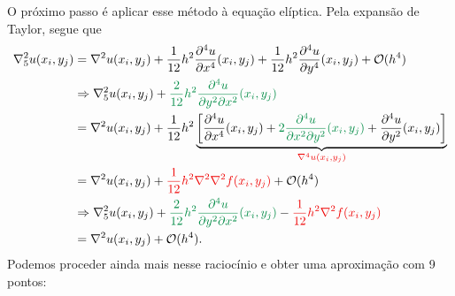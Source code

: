 \documentclass[../differential_methods.tex]{subfiles}
\begin{document}
O próximo passo é aplicar esse método à equação elíptica. Pela expansão de Taylor, segue que
\begin{align*}
	\nabla_{5}^{2}u(x_{i}, y_{j}) & =\nabla^{2}u(x_{i}, y_{j})+\frac{1}{12}h^{2}\frac{\partial^{4}u}{\partial x^{4}}(x_{i}, y_{j})+\frac{1}{12}h^{2}\frac{\partial^{4}u}{\partial y^{4}}(x_{i}, y_{j})+\mathcal{O}(h^{4})                                                                                                                                \\
	                              & \Rightarrow \nabla_{5}^{2}u(x_{i}, y_{j})+{\color{SpringGreen4}\frac{2}{12}h^{2}\frac{\partial^{4}u}{\partial y^{2}\partial x^{2}}(x_{i}, y_{j})}                                                                                                                                                                    \\
	                              & = \nabla^{2}u(x_{i}, y_{j})+\frac{1}{12}h^{2}\underbrace{\biggl[\frac{\partial^{4}u}{\partial x^{4}}(x_{i}, y_{j}) + {\color{SpringGreen4}2\frac{\partial^{4}u}{\partial x^{2}\partial y^{2}}(x_{i}, y_{j})} + \frac{\partial^{4}u}{\partial y^{2}}(x_{i}, y_{j})\biggr]}_{{\color{Red2} \nabla^{4}u(x_{i}, y_{j})}} \\
	                              & = \nabla^{2}u(x_{i}, y_{j})+{\color{Red2}\frac{1}{12}h^{2}\nabla^{2}\nabla^{2}f(x_{i}, y_{j})}+\mathcal{O}(h^{4})                                                                                                                                                                                                    \\
	                              & \Rightarrow \nabla_{5}^{2}u(x_{i}, y_{j})+{\color{SpringGreen4}\frac{2}{12}h^{2}\frac{\partial^{4}u}{\partial y^{2}\partial x^{2}}(x_{i}, y_{j})}-{\color{Red2}\frac{1}{12}h^{2}\nabla^{2}f(x_{i}, y_{j})}                                                                                                           \\
	                              & =\nabla^{2}u(x_{i}, y_{j})+\mathcal{O}(h^{4}).
\end{align*}
Podemos proceder ainda mais nesse raciocínio e obter uma aproximação com 9 pontos:
\end{document}
